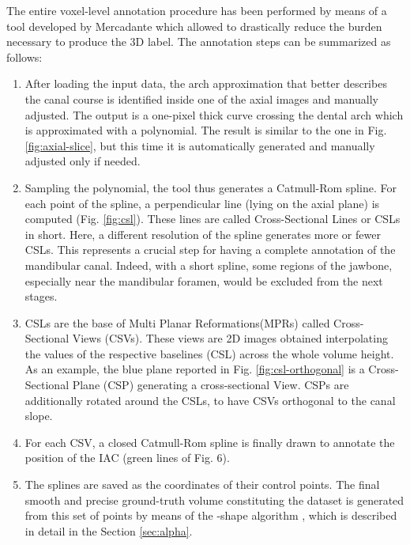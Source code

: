 The entire voxel-level annotation procedure has been performed by means of a
tool developed by Mercadante \etal \cite{mercadante2021cone} which allowed to
drastically reduce the burden necessary to produce the 3D label.
The annotation steps can be summarized as follows:
\begin{enumerate}
  \item{After loading the input data, the arch approximation that better
    describes the canal course is identified inside one of the axial images and
    manually adjusted. The output is a one-pixel thick curve crossing the dental
    arch which is approximated with a polynomial. The result is similar to the
    one in Fig. \ref{fig:axial-slice}, but this time it is automatically
    generated and manually adjusted only if needed.}

  \item{Sampling the polynomial, the tool thus generates a Catmull-Rom spline.
    For each point of the spline, a perpendicular line (lying on the axial
    plane) is computed (Fig. \ref{fig:csl}). These lines are called
    Cross-Sectional Lines or CSLs in short. Here, a different resolution of the
    spline generates more or fewer CSLs. This represents a crucial step for
    having a complete annotation of the mandibular canal. Indeed, with a short
    spline, some regions of the jawbone, especially near the mandibular foramen,
    would be excluded from the next stages.}

  \item{CSLs are the base of Multi Planar Reformations(MPRs) called
    Cross-Sectional Views (CSVs). These views are 2D images obtained
    interpolating the values of the respective baselines (CSL) across the whole
    volume height. As an example, the blue plane reported in Fig.
    \ref{fig:csl-orthogonal} is a Cross-Sectional Plane (CSP) generating a
    cross-sectional View. CSPs are additionally rotated around the CSLs, to have
    CSVs orthogonal to the canal slope.}

  \item{For each CSV, a closed Catmull-Rom spline is finally drawn to annotate
    the position of the IAC (green lines of Fig. 6).}

  \item{The splines are saved as the coordinates of their control points. The
    final smooth and precise ground-truth volume constituting the dataset is
    generated from this set of points by means of the \textalpha-shape algorithm
    \cite{edelsbrunner1983shape}, which is described in detail in the Section
    \ref{sec:alpha}.}
\end{enumerate}

